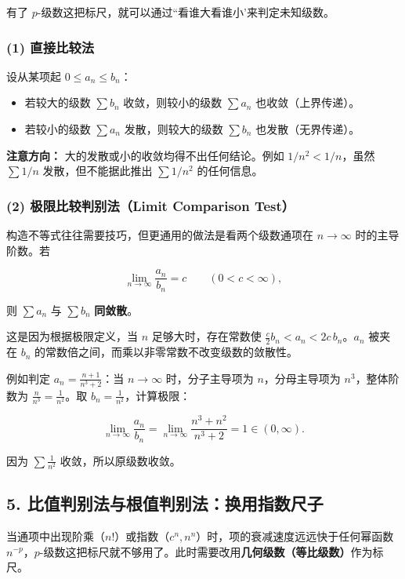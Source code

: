 有了 \(p\)-级数这把标尺，就可以通过``看谁大看谁小'来判定未知级数。

\subsubsection*{(1) 直接比较法}
设从某项起 \(0 \le a_n \le b_n\)：
\begin{itemize}
    \item 若较大的级数 \(\sum b_n\) 收敛，则较小的级数 \(\sum a_n\) 也收敛（上界传递）。
    \item 若较小的级数 \(\sum a_n\) 发散，则较大的级数 \(\sum b_n\) 也发散（无界传递）。
\end{itemize}

\textbf{注意方向：} 大的发散或小的收敛均得不出任何结论。例如 \(1/n^2 < 1/n\)，虽然 \(\sum 1/n\) 发散，但不能据此推出 \(\sum 1/n^2\) 的任何信息。

\subsubsection*{(2) 极限比较判别法（Limit Comparison Test）}
构造不等式往往需要技巧，但更通用的做法是看两个级数通项在 \(n \to \infty\) 时的主导阶数。若

\[
\lim_{n\to\infty} \frac{a_n}{b_n} = c \qquad (0 < c < \infty),
\]

则 \(\sum a_n\) 与 \(\sum b_n\) \textbf{同敛散}。

这是因为根据极限定义，当 \(n\) 足够大时，存在常数使 \(\frac{c}{2} b_n < a_n < 2c\, b_n\)。\(a_n\) 被夹在 \(b_n\) 的常数倍之间，而乘以非零常数不改变级数的敛散性。

例如判定 \(a_n = \frac{n+1}{n^3+2}\)：当 \(n \to \infty\) 时，分子主导项为 \(n\)，分母主导项为 \(n^3\)，整体阶数为 \(\frac{n}{n^3} = \frac{1}{n^2}\)。取 \(b_n = \frac{1}{n^2}\)，计算极限：

\[
\lim_{n\to\infty} \frac{a_n}{b_n} = \lim_{n\to\infty} \frac{n^3+n^2}{n^3+2} = 1 \in (0, \infty).
\]

因为 \(\sum \frac{1}{n^2}\) 收敛，所以原级数收敛。


\subsection{5. 比值判别法与根值判别法：换用指数尺子}

当通项中出现阶乘（\(n!\)）或指数（\(c^n, n^n\)）时，项的衰减速度远远快于任何幂函数 \(n^{-p}\)，\(p\)-级数这把标尺就不够用了。此时需要改用\textbf{几何级数（等比级数）}作为标尺。

